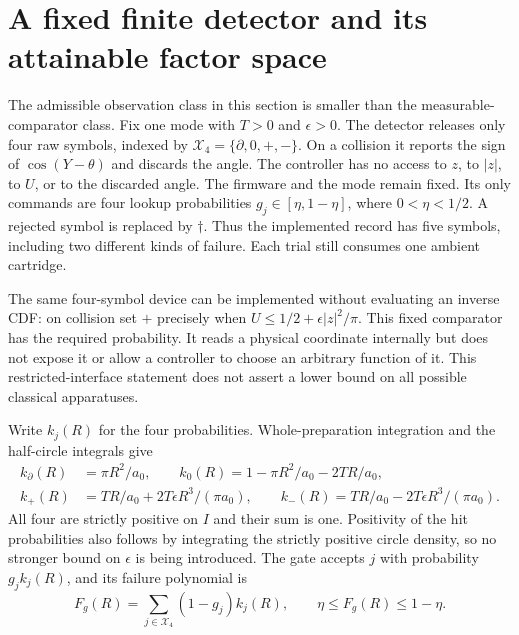 \section{A fixed finite detector and its attainable factor space}\label{sec:calibrated}
The admissible observation class in this section is smaller than the
measurable-comparator class. Fix one mode with $T>0$ and $\epsilon>0$.
The detector releases only four raw symbols, indexed by
$\mathcal X_4=\{\partial,0,+,-\}$. On a collision it reports the sign of
$\cos(Y-\theta)$ and discards the angle. The controller has no access to
$z$, to $|z|$, to $U$, or to the discarded angle. The firmware and the mode
remain fixed. Its only commands are four lookup probabilities
$g_j\in[\eta,1-\eta]$, where $0<\eta<1/2$. A rejected symbol is replaced by
$\dagger$. Thus the implemented record has five symbols, including two
different kinds of failure. Each trial still consumes one ambient cartridge.

The same four-symbol device can be implemented without evaluating an
inverse CDF: on collision set $+$ precisely when
$U\le 1/2+\epsilon |z|^2/\pi$. This fixed comparator has the required
probability. It reads a physical coordinate internally but does not expose
it or allow a controller to choose an arbitrary function of it. This
restricted-interface statement does not assert a lower bound on all
possible classical apparatuses.

Write $k_j(R)$ for the four probabilities. Whole-preparation integration
and the half-circle integrals give
\begin{equation}\label{eq:four-cells}
\begin{split}
k_\partial(R)&=\pi R^2/a_0,\qquad
k_0(R)=1-\pi R^2/a_0-2TR/a_0,\\
k_+(R)&=TR/a_0+2T\epsilon R^3/(\pi a_0),\qquad
k_-(R)=TR/a_0-2T\epsilon R^3/(\pi a_0).
\end{split}
\end{equation}
All four are strictly positive on $I$ and their sum is one. Positivity of
the hit probabilities also follows by integrating the strictly positive
circle density, so no stronger bound on $\epsilon$ is being introduced.
The gate accepts $j$ with probability $g_j k_j(R)$, and its failure
polynomial is
\begin{equation}\label{eq:finite-failure}
F_g(R)=\sum_{j\in\mathcal X_4}(1-g_j)k_j(R),\qquad
\eta\le F_g(R)\le1-\eta.
\end{equation}

